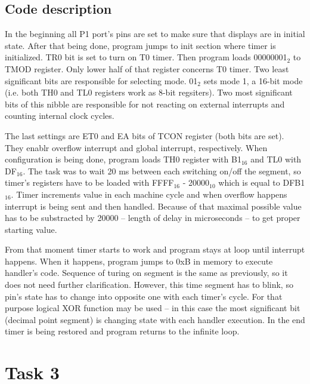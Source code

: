 \documentclass{article}
\begin{document}
\rmfamily
\subsection{Code description}
In the beginning all P1 port's pins are set to make sure that displays are in initial state.
After that being done, program jumps to init section where timer is initialized. TR0 bit is set
to turn on T0 timer. Then program loads 00000001$_2$ to TMOD register. Only lower half of that register
concerns T0 timer. Two least significant bits are responsible for selecting mode. 01$_2$ sets mode 1, 
a 16-bit mode (i.e. both TH0 and TL0 registers work as 8-bit regsiters). Two most significant bits of this nibble
are responsible for not reacting on external interrupts and counting internal clock cycles.

The last settings are ET0 and EA bits of TCON register (both bits are set). They enablr overflow interrupt and
global interrupt, respectively. When configuration is being done, program loads TH0 register with B1$_{16}$
and TL0 with DF$_{16}$. The task was to wait 20 ms between each switching on/off the segment, so timer's registers
have to be loaded with FFFF$_{16}$ - 20000$_{10}$ which is equal to DFB1$_{16}$. Timer increments value in each machine cycle
and when overflow happens interrupt is being sent and then handled. Because of that maximal possible value has to be
substracted by 20000 -- length of delay in microseconds -- to get proper starting value.

From that moment timer starts to work and program stays at loop until interrupt happens. When it happens, program jumps
to 0xB in memory to execute handler's code. Sequence of turing on segment is the same as previously, so it does not need
further clarification. However, this time segment has to blink, so pin's state has to change into opposite one with each
timer's cycle. For that purpose logical XOR function may be used -- in this case the most significant bit (decimal point segment) is changing state
with each handler execution. In the end timer is being restored and program returns to the infinite loop.

\section{Task 3}
\end{document}
